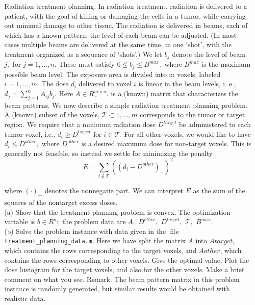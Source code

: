 \documentclass{article}
\begin{document}
Radiation treatment planning. In radiation treatment, radiation is delivered to a patient, with the
goal of killing or damaging the cells in a tumor, while carrying out minimal damage to other tissue.
The radiation is delivered in beams, each of which has a known pattern; the level of each beam can
be adjusted. (In most cases multiple beams are delivered at the same time, in one `shot', with the
treatment organized as a sequence of `shots'.) We let $b_j$ denote the level of beam $j,$ for $j = 1,\dots,n.$
These must satisfy $0 \leq b_j \leq B^{max},$ where $B^{max}$ is the maximum possible beam level. The exposure
area is divided into m voxels, labeled $i = 1,\dots,m.$ The dose $d_i$ delivered to voxel $i$ is linear in the beam levels, i. e., $d_j = \sum_{j=1}^n A_{ij}b_j.$
Here $A \in R_{+}^{m \times n}.$ is a (known) matrix
that characterizes the beam patterns. We now describe a simple radiation treatment planning problem. A (known) subset of the voxels, $\mathcal{T} \subset {1,\dots ,m}$
corresponds to the tumor or target region. We
require that a minimum radiation dose $D^{target}$ be administered to each tumor voxel, i.e., 
$d_i \geq D^{target}$ for $i \in \mathcal{T}.$ For all other voxels, we would like to have $d_i \leq D^{other},$ 
where $D^{other}$ is a desired maximum dose for non-target voxels. This is generally not feasible, so instead we settle for minimizing the penalty
$$
E = \sum_{i \notin \mathcal{T}}((d_i - D^{other})_{+})^2
$$

where $(\cdot)_+$ denotes the nonnegatie part. We can interpret $E$ as the sum of the squares of the
nontarget excess doses. \\

(a) Show that the treatment planning problem is convex. The optimization variable is $b \in R^n;$ the problem data are $A,$ $D^{other},$ $D^{target},$ $\mathcal{T},$
$B^{max}.$ \\

(b) Solve the problem instance with data given in the file \verb!treatment_planning_data.m!. Here we
have split the matrix $A$ into $Atarget$, which contains the rows corresponding to the target
voxels, and $Aother$, which contains the rows corresponding to other voxels. Give the optimal
value. Plot the dose histogram for the target voxels, and also for the other voxels. Make a
brief comment on what you see. Remark. The beam pattern matrix in this problem instance
is randomly generated, but similar results would be obtained with realistic data.\\
\end{document}
